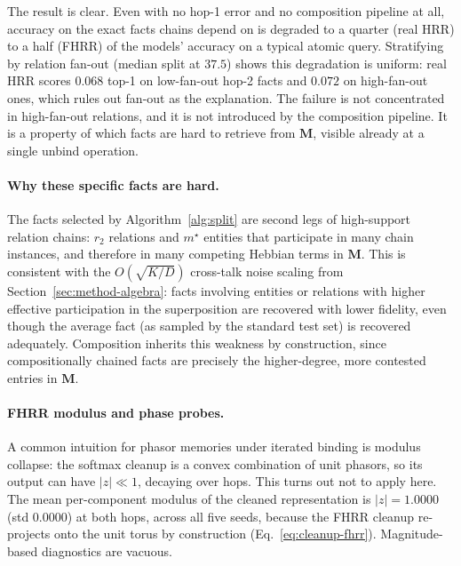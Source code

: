 \documentclass[11pt]{article}
\theoremstyle{definition}
\newcommand{\mem}{\mathbf{M}}
\begin{document}
The result is clear. Even with no hop-1 error and no composition pipeline at
all, accuracy on the exact facts chains depend on is degraded to a quarter
(real HRR) to a half (FHRR) of the models' accuracy on a typical atomic query.
Stratifying by relation fan-out (median split at $37.5$) shows this degradation
is uniform: real HRR scores $0.068$ top-1 on low-fan-out hop-2 facts and
$0.072$ on high-fan-out ones, which rules out fan-out as the explanation. The
failure is not concentrated in high-fan-out relations, and it is not introduced
by the composition pipeline. It is a property of which facts are hard to retrieve
from $\mem$, visible already at a single unbind operation.

\paragraph{Why these specific facts are hard.}
The facts selected by Algorithm~\ref{alg:split} are second legs of
high-support relation chains: $r_2$ relations and $m^\star$ entities that
participate in many chain instances, and therefore in many competing Hebbian
terms in $\mem$. This is consistent with the $O(\sqrt{K/D})$ cross-talk noise
scaling from Section~\ref{sec:method-algebra}: facts involving entities or
relations with higher effective participation in the superposition are recovered
with lower fidelity, even though the average fact (as sampled by the standard
test set) is recovered adequately. Composition inherits this weakness by
construction, since compositionally chained facts are precisely the
higher-degree, more contested entries in $\mem$.

\paragraph{FHRR modulus and phase probes.}
A common intuition for phasor memories under iterated binding is modulus
collapse: the softmax cleanup is a convex combination of unit phasors, so its
output can have $|z| \ll 1$, decaying over hops. This turns out not to apply
here. The mean per-component modulus of the cleaned representation is $|z| = 1.0000$
(std $0.0000$) at both hops, across all five seeds, because the FHRR cleanup
re-projects onto the unit torus by construction (Eq.~\ref{eq:cleanup-fhrr}).
Magnitude-based diagnostics are vacuous.
\end{document}
